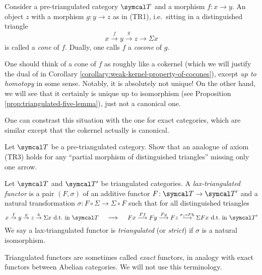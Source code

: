 \begin{terminology}
	Consider a pre-triangulated category \(\calT\) and a morphism \(f\!:x\to y\). An object \(z\) with a morphism \(g\!:y\to z\) as in (TR1), i.e.\ sitting in a distinguished triangle
	\[ x\overset{f}\to y \overset{g}\to z \to \Sigma x \]
	is called a \emph{cone} of \(f\). Dually, one calls \(f\) a \emph{cocone} of \(g\).
\end{terminology}
\begin{remark}
	One should think of a cone of \(f\) as roughly like a cokernel (which we will justify the dual of in Corollary \ref{corollary:weak-kernel-property-of-cocones}), except \emph{up to homotopy} in some sense. Notably, it is
	absolutely not unique! On the other hand, we will see that it certainly is unique up to isomorphism (see Proposition \ref{prop:triangulated-five-lemma}), just not a canonical one.

	One can constrast this situation with the one for exact categories, which are similar except that the cokernel actually is canonical.
\end{remark}
\begin{exercise}\label{exercise:partial-morphism-of-dts-fills}
	Let \(\calT\) be a pre-triangulated category. Show that an analogue of axiom (TR3) holds for any ``partial morphism of distinguished triangles'' missing only one arrow.
\end{exercise}

\begin{definition}
	Let \(\calT\) and \(\calT'\) be triangulated categories. A \emph{lax-triangulated functor} is a pair \((F,\sigma)\) of an additive functor \(F\!:\calT\to\calT'\) and a natural transformation \(\sigma\!:F\circ\Sigma \to \Sigma\circ F\)
	such that for all distinguished triangles
	\[ x \overset{f}\to y \overset{g}\to z \overset{h}\to \Sigma x\text{ d.t.\ in }\calT\quad\implies\quad Fx\overset{Ff}\longto Fy\overset{Fg}\longto Fz\overset{\sigma_{z}\circ Fh}\longto \Sigma Fx\text{ d.t.\ in }\calT' \]
	We say a lax-triangulated functor is \emph{triangulated} (or \emph{strict}) if \(\sigma\) is a natural isomorphism.
\end{definition}
\begin{remark}
	Triangulated functors are sometimes called \emph{exact} functors, in analogy with exact functors between Abelian categories. We will not use this terminology.
\end{remark}

